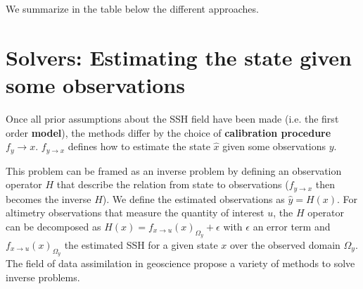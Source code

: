 \begin{bibunit}
We summarize in the table below the different approaches.
  \begin{table}
  \centering
\caption{\textbf{Comparison of SSH models across various methods}. The columns indicate the type of state representation $x$, the method of obtaining estimated SSH $\hat{u}$, and the prior distribution $p(x)$. Methods annoted with $^{(*)}$ consider the state of a single time step at a time.}
\end{table}



\section{Solvers: Estimating the state given some observations}
  \label{c2sec:solvers}
Once all prior assumptions about the SSH field have been made (i.e. the first order \textbf{model}), the methods differ by the choice of \textbf{calibration procedure} $f_y{\to x}$. $f_{y\to x}$ defines how to estimate the state $\hat{x}$ given some observations $y$.

This problem can be framed as an inverse problem by defining an observation operator $H$ that describe the relation from state to observations ($f_{y\to x}$ then becomes the inverse $H$).
We define the estimated observations as $\hat{y} = H(x)$. For altimetry observations that measure the quantity of interest $u$, the $H$ operator can be decomposed as $H(x) = f_{x\to u}(x)_{\Omega_y} + \epsilon$ with $\epsilon$ an error term and $f_{x\to u}(x)_{\Omega_y}$ the estimated SSH for a given state $x$ over the observed domain $\Omega_y$. The field of data assimilation in geoscience propose a variety of methods to solve inverse problems.


\end{bibunit}
